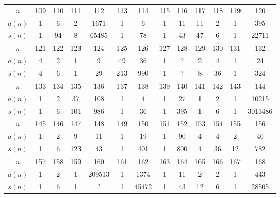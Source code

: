 \begin{table}[ht]
\begin{tabular}{|c|cccccccccccc|}
		\hline
		$n$ & 109 & 110 & 111 & 112 & 113 & 114 & 115 & 116 & 117 & 118 & 119 & 120\tabularnewline
		$a(n)$ & 1 & 6 & 2 & 1671 & 1 & 6 & 1 & 11 & 11 & 2 & 1 & 395\tabularnewline
		$s(n)$ & 1 & 94 &  8 & 65485 &  1 & 78 &  1 & 43 &  47 &  6 &  1 & 22711 \tabularnewline
		\hline

		$n$ & 121 & 122 & 123 & 124 & 125 & 126 & 127 & 128 & 129 & 130 & 131 & 132\tabularnewline
		$a(n)$ & 4 & 2 & 1 &  9  & 49 & 36 & 1 & ? & 2 &  4 & 1 & 24\tabularnewline
		$s(n)$ & 4 & 6 & 1 & 29 & 213 & 990 & 1 & ? & 8 & 36 & 1 & 324 \tabularnewline
		\hline

		$n$  & 133 & 134 & 135 & 136 & 137 & 138 & 139 & 140 & 141 & 142 & 143 & 144\tabularnewline
		$a(n)$ & 1 & 2 & 37 & 108 & 1 & 4 & 1 & 27 & 1 & 2 & 1 & 10215\tabularnewline
		$s(n)$ & 1 & 6 & 101 & 986 & 1 & 36 & 1 & 395 & 1 & 6 & 1 & 3013486 \tabularnewline
		\hline
		
		$n$ & 145 & 146 & 147 & 148 & 149 & 150 & 151 & 152 & 153 & 154 & 155 & 156\tabularnewline
		$a(n)$ & 1 & 2 & 9 & 11 & 1 & 19 & 1 & 90 & 4 & 4 & 2 & 40\tabularnewline
		$s(n)$ & 1 & 6 & 123 & 43 & 1 & 401 & 1 & 800 & 4 & 36 & 12 & 782 \tabularnewline
		\hline

		$n$ & 157 & 158 & 159 & 160 & 161 & 162 & 163 & 164 & 165 & 166 & 167 & 168\tabularnewline
		$a(n)$ & 1 & 2 & 1 & 209513 & 1 & 1374 & 1 & 11 & 2 & 2 & 1 & 443\tabularnewline
		$s(n)$ & 1 & 6 & 1 & ? & 1 & 45472 & 1 & 43 & 12 & 6 & 1 & 28505 \tabularnewline
		\hline
	\end{tabular}
	\label{tab:braces}
\end{table}




